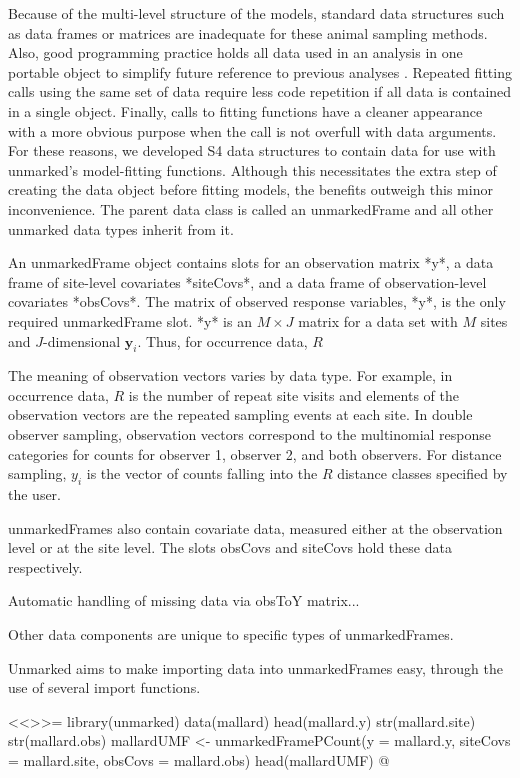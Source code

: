 Because of the multi-level structure of the models, standard data
structures such as data frames or matrices are inadequate for these
animal sampling methods.  Also, good programming practice holds all
data used in an analysis in one portable object to simplify future
reference to previous analyses \citep{gentleman_r_2008}.  Repeated fitting
calls using the same set of data require less code repetition if all
data is contained in a single object.  Finally, calls to fitting
functions have a cleaner appearance with a more obvious purpose when
the call is not overfull with data arguments.  For these reasons, we
developed S4 data structures to contain data for use with unmarked's
model-fitting functions.  Although this necessitates the extra step of
creating the data object before fitting models, the benefits outweigh
this minor inconvenience.  The parent data class is called an
unmarkedFrame and all other unmarked data types inherit from it.

An unmarkedFrame object contains slots for an observation matrix
*y*, a data frame of site-level covariates *siteCovs*, and a data
frame of observation-level covariates *obsCovs*.  The matrix of
observed response variables, *y*, is the only required unmarkedFrame
slot.  *y* is an $M \times J$ matrix for a data set with $M$ sites
and $J$-dimensional $\bm y_i$.  Thus, for occurrence data, $R$

The meaning of observation vectors varies by data type.  For
example, in occurrence data, $R$ is the number of repeat site visits
and elements of the observation vectors are the repeated sampling
events at each site.  In double observer sampling, observation vectors
correspond to the multinomial response categories for counts for
observer 1, observer 2, and both observers.  For distance sampling,
$y_i$ is the vector of counts falling into the $R$ distance classes
specified by the user.

unmarkedFrames also contain covariate data, measured either at the
observation level or at the site level.  The slots obsCovs and
siteCovs hold these data respectively.

Automatic handling of missing data via obsToY matrix...

Other data components are unique to specific types of unmarkedFrames.

Unmarked aims to make importing data into unmarkedFrames easy, through
the use of several import functions.

<<>>=
library(unmarked)
data(mallard)
head(mallard.y)
str(mallard.site)
str(mallard.obs)
mallardUMF <- unmarkedFramePCount(y = mallard.y, siteCovs = mallard.site, obsCovs = mallard.obs)
head(mallardUMF)
@

